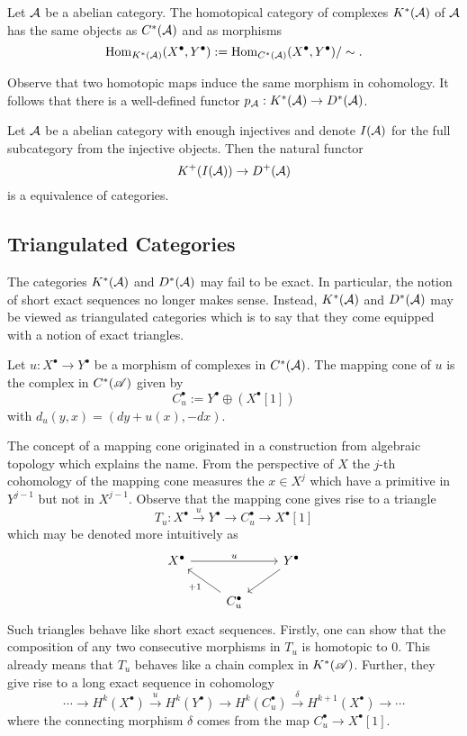 \begin{definition}
  Let $\AA$ be a abelian category.
  The homotopical category of complexes $K^*(\AA)$ of $\AA$ has the same objects as $C^*(\AA)$ and as morphisms
  $$\operatorname{Hom}_{K^*(\AA)}(X^\bullet,Y^\bullet):= \operatorname{Hom}_{C^*(\AA)}(X^\bullet,Y^\bullet)/\sim.$$
\end{definition}
Observe that two homotopic maps induce the same morphism in cohomology.
It follows that there is a well-defined functor $p_\AA:K^*(\AA)\to D^*(\AA)$.
\begin{proposition}
  Let $\AA$ be a abelian category with enough injectives and denote $I(\AA)$ for the full subcategory from the injective objects.
  Then the natural functor
  $$K^+(I(\AA))\to D^+(\AA) $$
  is a equivalence of categories.
\end{proposition}

\subsection{Triangulated Categories}
The categories $K^*(\AA)$ and $D^*(\AA)$ may fail to be exact.
In particular, the notion of short exact sequences no longer makes sense.
Instead, $K^*(\AA)$ and $D^*(\AA)$ may be viewed as triangulated categories which is to say that they come equipped with a notion of exact triangles.
\begin{definition}
  Let $u:X^\bullet \to Y^\bullet$ be a morphism of complexes in $C^*(\AA)$.
  The mapping cone of $u$ is the complex in $C^*(\A)$ given by
  $$C_u^\bullet := Y^\bullet \oplus (X^\bullet[1]) $$
  with $d_u(y,x)= (dy + u(x) , -dx)$.
\end{definition}
The concept of a mapping cone originated in a construction from algebraic topology which explains the name.
From the perspective of $X$ the $j$-th cohomology of the mapping cone measures the $x\in X^j$ which have a primitive in $Y^{j-1}$ but not in $X^{j-1}$.
Observe that the mapping cone gives rise to a triangle
$$T_u:X^\bullet \xrightarrow{u} Y^\bullet \to C_u^\bullet \to X^\bullet[1]$$
which may be denoted more intuitively as
$$
  \begin{tikzcd}
    X^\bullet \arrow{rr}{u}& & Y^\bullet \arrow{dl}{}\\
    & C_u^\bullet\arrow{lu}{+1}
  \end{tikzcd}
$$
Such triangles behave like short exact sequences.
Firstly, one can show that the composition of any two consecutive morphisms in $T_u$ is homotopic to $0$.
This already means that $T_u$ behaves like a chain complex in $K^*(\A)$.
Further, they give rise to a long exact sequence in cohomology
$$\cdots \to H^k(X^\bullet) \xrightarrow{u} H^k(Y^\bullet) \to H^k(C_u^\bullet) \xrightarrow{\delta} H^{k+1}(X^\bullet) \to \cdots$$
where the connecting morphism $\delta$ comes from the map $C_u^\bullet \to X^\bullet[1]$.

